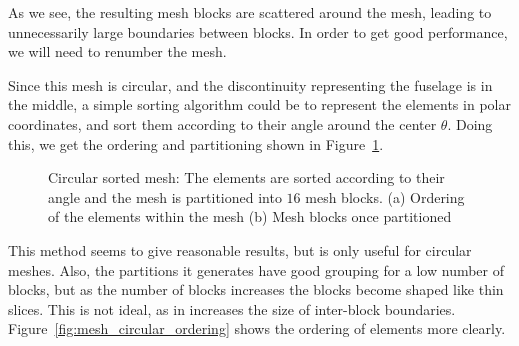 As we see, the resulting mesh blocks are scattered around the mesh, leading to unnecessarily large
boundaries between blocks. In order to get good performance, we will need to renumber the mesh. 

Since this mesh is circular, and the discontinuity representing the fuselage is in the middle, a
simple sorting algorithm could be to represent the elements in polar coordinates, and sort them
according to their angle around the center \(\theta \). Doing this, we get the ordering and
partitioning shown in Figure~\ref{fig:mesh_circular}.

\begin{figure}[H]
	\centering
	\caption{Circular sorted mesh: The elements are sorted according to their angle and the mesh is partitioned into \(16\) mesh blocks. (a) Ordering of the elements within the mesh (b) Mesh blocks once partitioned}\label{fig:mesh_circular}
\end{figure}

This method seems to give reasonable results, but is only useful for circular meshes. Also, the
partitions it generates have good grouping for a low number of blocks, but as the number of blocks
increases the blocks become shaped like thin slices. This is not ideal, as in increases the size of
inter-block boundaries. Figure~\ref{fig:mesh_circular_ordering} shows the ordering of elements more
clearly.

